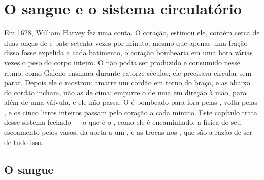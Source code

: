 \chapter{O sangue e o sistema circulatório}\label{ch:b2:blood-circulation}

Em 1628, William Harvey fez uma conta. O coração, estimou ele, contém
cerca de duas onças de  e bate setenta vezes por minuto; mesmo
que apenas uma fração disso fosse expelida a cada batimento, o coração
bombearia em uma hora várias vezes o peso do corpo inteiro. O 
não podia ser produzido e consumido nesse ritmo, como Galeno ensinara
durante catorze séculos; ele precisava circular sem parar. Depois ele o
mostrou: amarre um cordão em torno do braço, e as  abaixo do
cordão incham, não as de cima; empurre o  de uma  em direção
à mão, para além de uma válvula, e ele não passa. O  é bombeado
para fora pelas , volta pelas , e os cinco litros inteiros
passam pelo coração a cada minuto. Este capítulo trata desse sistema
fechado --- o que é o , como ele é encaminhado, a física de seu
escoamento pelos vasos, da aorta a um , e as trocas nos
, que são a razão de ser de tudo isso.

\section{O sangue}

